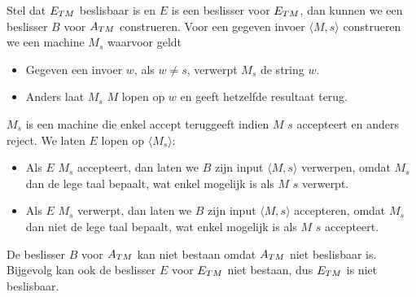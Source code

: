   Stel dat ${E_{TM}}$ beslisbaar is en $E$ is een beslisser voor ${E_{TM}}$, dan kunnen we een beslisser $B$ voor ${A_{TM}}$ construeren. Voor een gegeven invoer $\langle M,s \rangle$ construeren we een machine $M_s$ waarvoor geldt
  \begin{itemize}
  \item Gegeven een invoer $w$, als $w \neq s$, verwerpt $M_s$ de string $w$.
  \item Anders laat $M_s$ $M$ lopen op $w$ en geeft hetzelfde resultaat terug.
  \end{itemize}
  $M_s$ is een machine die enkel accept teruggeeft indien $M$ $s$ accepteert en anders reject. We laten $E$ lopen op $\langle M_s \rangle$:
  \begin{itemize}
  \item Als $E$ $M_s$ accepteert, dan laten we $B$ zijn input $\langle M,s \rangle$ verwerpen, omdat $M_s$ dan de lege taal bepaalt, wat enkel mogelijk is als $M$ $s$ verwerpt.
  \item Als $E$ $M_s$ verwerpt, dan laten we $B$ zijn input $\langle M,s \rangle$ accepteren, omdat $M_s$ dan niet de lege taal bepaalt, wat enkel mogelijk is als $M$ $s$ accepteert.
  \end{itemize}
  
  De beslisser $B$ voor ${A_{TM}}$ kan niet bestaan omdat ${A_{TM}}$ niet beslisbaar is. Bijgevolg kan ook de beslisser $E$ voor ${E_{TM}}$ niet bestaan, dus ${E_{TM}}$ is niet beslisbaar.